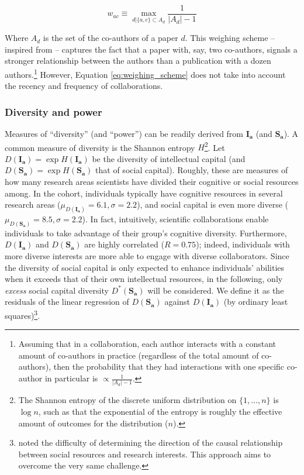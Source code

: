 \documentclass{article}
\begin{document}
\begin{equation}
    w_{ac} \equiv \max_{d|\{a,c\} \subset A_d} \frac{1}{|A_d|-1}
    \label{eq:weighing_scheme}
\end{equation}

Where $A_d$ is the set of the co-authors of a paper $d$. This weighing scheme -- inspired from \citealt{Newman2004} -- captures the fact that a paper with, say, two co-authors, signals a stronger relationship between the authors than a publication with a dozen authors.\footnote{Assuming that in a collaboration, each author interacts with a constant amount of co-authors in practice (regardless of the total amount of co-authors), then the probability that they had interactions with one specific co-author in particular is $\propto \frac{1}{|A_d|-1}$. 
} However, Equation \eqref{eq:weighing_scheme} does not take into account the recency and frequency of collaborations.

\subsubsection{Diversity and power}

Measures of ``diversity'' (and ``power'') can be readily derived from $\bm{I_a}$ (and $\bm{S_a}$). A common measure of diversity is the Shannon entropy $H$\footnote{The Shannon entropy of the discrete uniform distribution on $\{1,\dots,n\}$ is $\log{n}$, such as that the exponential of the entropy is roughly the effective amount of outcomes for the distribution ($n$).}. Let 
 $D(\bm{I_a})=\exp{H(\bm{I_a})}$ be the diversity of intellectual capital (and $D(\bm{S_a})=\exp{H(\bm{S_a})}$ that of social capital). Roughly, these are measures of how many research areas scientists have divided their cognitive or social resources among. In the cohort, individuals typically have cognitive resources in several research areas ($\mu_{D(\bm{I_a})}=6.1,\sigma=2.2$), and social capital is even more diverse ($\mu_{D(\bm{S_a})}=8.5,\sigma=2.2$). In fact, intuitively,  scientific collaborations enable individuals to take advantage of their group's cognitive diversity. Furthermore, $D(\bm{I_a})$ and $D(\bm{S_a})$ are highly correlated ($R=0.75$); indeed, individuals with more diverse interests are more able to engage with diverse collaborators. Since the diversity of social capital is only expected to enhance individuals' abilities when it exceeds that of their own intellectual resources, in the following, only \textit{excess} social capital diversity $D^{\ast}(\bm{S_a})$ will be considered. We define it as the residuals of the linear regression of $D(\bm{S_a})$ against $D(\bm{I_a})$ (by ordinary least squares)\footnote{\citet{Tripodi2020} noted the difficulty of determining the direction of the causal relationship between social resources and research interests. This approach aims to overcome the very same challenge.}.
\end{document}
